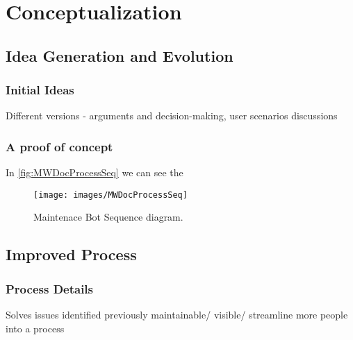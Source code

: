 \chapter{Conceptualization}\label{chapter:Conceptualization}

\section{Idea Generation and Evolution}
\subsection{Initial Ideas}

Different versions - arguments and decision-making, user scenarios discussions
\subsection{A proof of concept}

In \autoref{fig:MWDocProcessSeq}  we can see the 
\begin{figure}[htsb]
  \centering
  \texttt{[image: images/MWDocProcessSeq]}
  \caption[Maintenace Bot Sequence diagram]{Maintenace Bot Sequence diagram.}\label{fig:MWDocProcessSeq}
\end{figure}

\section{Improved Process}

\subsection{Process Details}
	Solves issues identified previously
 	maintainable/ visible/ streamline more people into a process
